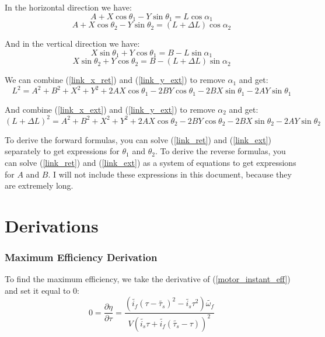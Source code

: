 \documentclass[11pt,a4paper,titlepage]{article}
\begin{document}
	In the horizontal direction we have:
	\begin{equation} \label{link_x_ret}
		A + X \cos \theta_1 - Y \sin \theta_1 = L \cos \alpha_1
	\end{equation}
	\begin{equation} \label{link_x_ext}
		A + X \cos \theta_2 - Y \sin \theta_2 = (L + \Delta L) \cos \alpha_2
	\end{equation}
	
	And in the vertical direction we have:
	\begin{equation} \label{link_y_ret}
		X \sin \theta_1 + Y \cos \theta_1 = B - L \sin \alpha_1
	\end{equation}
	\begin{equation} \label{link_y_ext}
		X \sin \theta_2 + Y \cos \theta_2 = B - (L + \Delta L) \sin \alpha_2
	\end{equation}
	
	We can combine (\ref{link_x_ret}) and (\ref{link_y_ext}) to remove $\alpha_1$ and get:
	\begin{equation} \label{link_ret}
		L^2 = A^2 + B^2 + X^2 + Y^2 + 2AX \cos \theta_1 - 2BY \cos \theta_1 - 2BX \sin \theta_1 - 2AY \sin \theta_1
	\end{equation}
	
	And combine (\ref{link_x_ext}) and (\ref{link_y_ext}) to remove $\alpha_2$ and get:
	\begin{equation} \label{link_ext}
		(L + \Delta L)^2 = A^2 + B^2 + X^2 + Y^2 + 2AX \cos \theta_2 - 2BY \cos \theta_2 - 2BX \sin \theta_2 - 2AY \sin \theta_2
	\end{equation}
	
	To derive the forward formulas, you can solve (\ref{link_ret}) and (\ref{link_ext}) separately to get expressions for $\theta_1$ and $\theta_2$. To derive the reverse formulas, you can solve (\ref{link_ret}) and (\ref{link_ext}) as a system of equations to get expressions for $A$ and $B$. I will not include these expressions in this document, because they are extremely long.
	
	\newpage
	\appendix
	\part*{Derivations}
	\section{Maximum Efficiency Derivation} \label{appendixA}
	To find the maximum efficiency, we take the derivative of (\ref{motor_instant_eff}) and set it equal to 0:
	\begin{equation}
		0 = \frac{\partial \eta}{\partial \tau} = \frac{(\tilde{i_f} (\tau - \tilde{\tau_s})^2 - \tilde{i_s} \tau^2) \tilde{\omega_f}}{V (\tilde{i_s} \tau + \tilde{i_f} (\tilde{\tau_s} - \tau))^2}
	\end{equation}
	
\end{document}
